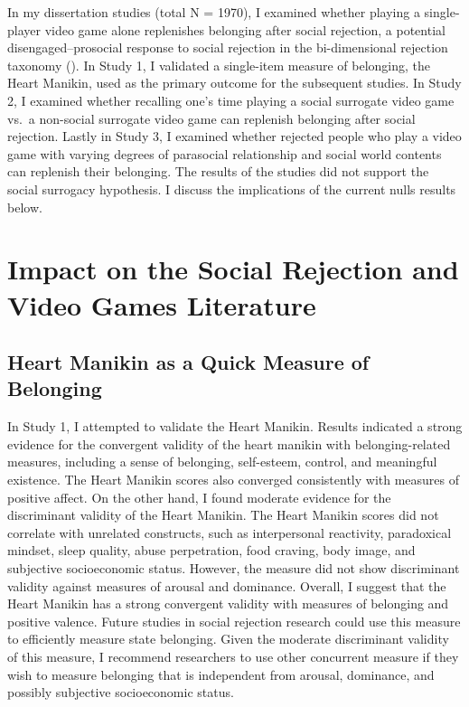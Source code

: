 \documentclass[
]{udthesis}
\begin{document}
In my dissertation studies (total N = 1970), I examined whether playing a single-player
video game alone replenishes belonging after social rejection, a
potential disengaged--prosocial response to social rejection in the
bi-dimensional rejection taxonomy (). In Study 1, I
validated a single-item measure of belonging, the Heart Manikin, used as
the primary outcome for the subsequent studies. In Study 2, I examined
whether recalling one's time playing a social surrogate video game vs.~a
non-social surrogate video game can replenish belonging after social
rejection. Lastly in Study 3, I examined whether rejected people who
play a video game with varying degrees of parasocial relationship and
social world contents can replenish their belonging. The results of the
studies did not support the social surrogacy hypothesis. I discuss the
implications of the current nulls results below.

\section{Impact on the Social Rejection and Video Games Literature}\label{impact-on-the-social-rejection-and-video-games-literature}

\subsection{Heart Manikin as a Quick Measure of Belonging}\label{heart-manikin-as-a-quick-measure-of-belonging}

In Study 1, I attempted to validate the Heart Manikin. Results indicated
a strong evidence for the convergent validity of the heart manikin with
belonging-related measures, including a sense of belonging, self-esteem,
control, and meaningful existence. The Heart Manikin scores also
converged consistently with measures of positive affect. On the other
hand, I found moderate evidence for the discriminant validity of the
Heart Manikin. The Heart Manikin scores did not correlate with unrelated
constructs, such as interpersonal reactivity, paradoxical mindset, sleep
quality, abuse perpetration, food craving, body image, and subjective
socioeconomic status. However, the measure did not show discriminant
validity against measures of arousal and dominance. Overall, I suggest
that the Heart Manikin has a strong convergent validity with measures of
belonging and positive valence. Future studies in social rejection
research could use this measure to efficiently measure state belonging.
Given the moderate discriminant validity of this measure, I recommend
researchers to use other concurrent measure if they wish to measure
belonging that is independent from arousal, dominance, and possibly
subjective socioeconomic status.
\end{document}
